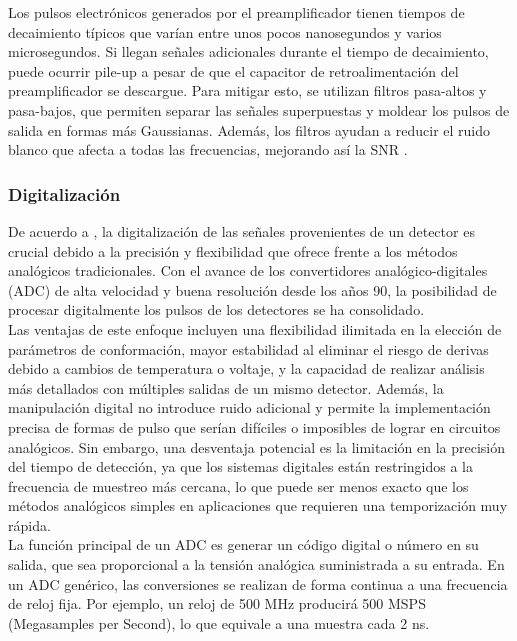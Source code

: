 \documentclass[]{book}
\begin{document}
\noindent Los pulsos electrónicos generados por el preamplificador tienen tiempos de decaimiento típicos que varían entre unos pocos nanosegundos y varios microsegundos. Si llegan señales adicionales durante el tiempo de decaimiento, puede ocurrir pile-up a pesar de que el capacitor de retroalimentación del preamplificador se descargue. Para mitigar esto, se utilizan filtros pasa-altos y pasa-bajos, que permiten separar las señales superpuestas y moldear los pulsos de salida en formas más Gaussianas. Además, los filtros ayudan a reducir el ruido blanco que afecta a todas las frecuencias, mejorando así la SNR \cite{kolanoski2020particle}.\\

\subsubsection{Digitalización}

\noindent De acuerdo a \cite{knoll2010radiation}, la digitalización de las señales provenientes de un detector es crucial debido a la precisión y flexibilidad que ofrece frente a los métodos analógicos tradicionales. Con el avance de los convertidores analógico-digitales (ADC) de alta velocidad y buena resolución desde los años 90, la posibilidad de procesar digitalmente los pulsos de los detectores se ha consolidado.\\

\noindent Las ventajas de este enfoque incluyen una flexibilidad ilimitada en la elección de parámetros de conformación, mayor estabilidad al eliminar el riesgo de derivas debido a cambios de temperatura o voltaje, y la capacidad de realizar análisis más detallados con múltiples salidas de un mismo detector. Además, la manipulación digital no introduce ruido adicional y permite la implementación precisa de formas de pulso que serían difíciles o imposibles de lograr en circuitos analógicos. Sin embargo, una desventaja potencial es la limitación en la precisión del tiempo de detección, ya que los sistemas digitales están restringidos a la frecuencia de muestreo más cercana, lo que puede ser menos exacto que los métodos analógicos simples en aplicaciones que requieren una temporización muy rápida.\\

\noindent La función principal de un ADC es generar un código digital o número en su salida, que sea proporcional a la tensión analógica suministrada a su entrada. En un ADC genérico, las conversiones se realizan de forma continua a una frecuencia de reloj fija. Por ejemplo, un reloj de 500 MHz producirá 500 MSPS (Megasamples per Second), lo que equivale a una muestra cada 2 ns. \\
\end{document}
